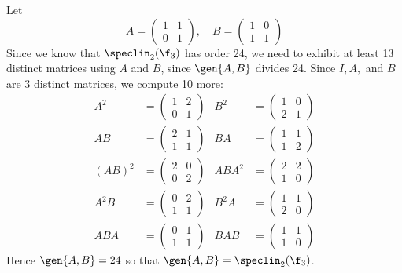 \begin{sol}
    Let
    \[A = \begin{pmatrix}1 & 1 \\ 0 & 1\end{pmatrix}, \quad B = \begin{pmatrix} 1 & 0 \\ 1 & 1 \end{pmatrix}\]
    Since we know that $\speclin_2(\f_3)$ has order 24, we need to exhibit at least 13 distinct matrices using $A$ and $B$, since $\gen{A, B}$ divides 24. Since $I, A,$ and $B$ are 3 distinct matrices, we compute 10 more:
    \begin{align*}
    A^2 &= \begin{pmatrix}1 & 2 \\ 0 & 1\end{pmatrix} & B^2 &= \begin{pmatrix}1 & 0 \\ 2 & 1\end{pmatrix} \\
    AB &= \begin{pmatrix}2 & 1 \\ 1 & 1\end{pmatrix} & BA &= \begin{pmatrix}1 & 1 \\ 1 & 2\end{pmatrix} \\
    (AB)^2 &= \begin{pmatrix}2 & 0 \\ 0 & 2\end{pmatrix} & ABA^2 &= \begin{pmatrix}2 & 2 \\ 1 & 0\end{pmatrix} \\
    A^2 B &= \begin{pmatrix}0 & 2 \\ 1 & 1\end{pmatrix} & B^2 A &= \begin{pmatrix}1 & 1 \\ 2 & 0\end{pmatrix} \\
    ABA &= \begin{pmatrix}0 & 1 \\ 1 & 1\end{pmatrix} & BAB &= \begin{pmatrix}1 & 1 \\ 1 & 0\end{pmatrix} 
    \end{align*}
    Hence $\gen{A, B} = 24$ so that $\gen{A, B} = \speclin_2(\f_3)$.
\end{sol}

